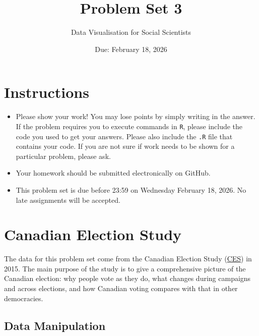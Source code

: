 \documentclass[12pt,letterpaper]{article}
\title{Problem Set 3}
\date{Due: February 18, 2026}
\author{Data Visualisation for Social Scientists}
\begin{document}
	\maketitle
	
	\section*{Instructions}
	\begin{itemize}
	\item Please show your work! You may lose points by simply writing in the answer. If the problem requires you to execute commands in \texttt{R}, please include the code you used to get your answers. Please also include the \texttt{.R} file that contains your code. If you are not sure if work needs to be shown for a particular problem, please ask.
\item Your homework should be submitted electronically on GitHub.
\item This problem set is due before 23:59 on Wednesday February 18, 2026. No late assignments will be accepted.
	\end{itemize}
	
	\vspace{.25cm}
	\section*{Canadian Election Study}
	
The data for this problem set come from the	Canadian Election Study (\href{https://ces-eec.sites.olt.ubc.ca/files/2017/04/CES2015_Combined_Data_Codebook.pdf}{CES})  in 2015. The main purpose of the study is to give a comprehensive picture of the Canadian election: why people vote as they do, what changes during campaigns and across elections, and how Canadian voting compares with that in other democracies.

\subsection*{Data Manipulation}
\end{document}

